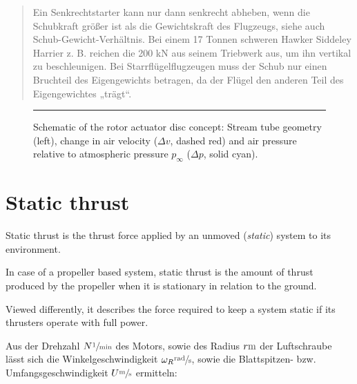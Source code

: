 \begin{quote}
Ein Senkrechtstarter kann nur dann senkrecht abheben, wenn die Schubkraft größer ist als die Gewichtskraft des Flugzeugs, siehe auch Schub-Gewicht-Verhältnis. Bei einem 17 Tonnen schweren Hawker Siddeley Harrier z. B. reichen die 200 kN aus seinem Triebwerk aus, um ihn vertikal zu beschleunigen. Bei Starrflügelflugzeugen muss der Schub nur einen Bruchteil des Eigengewichts betragen, da der Flügel den anderen Teil des Eigengewichtes „trägt“.
\end{quote}

\begin{figure}
	

	\rule{35em}{0.5pt}
	\caption[Schematic of the rotor actuator disc concept]
			{Schematic of the rotor actuator disc concept: Stream tube geometry (left),
			 change in air velocity ($\Delta v$, dashed red) and
			 air pressure relative to 
			 atmospheric pressure $p_\infty$ ($\Delta p$, solid cyan).}
	\label{fig:actuator_disc}
\end{figure}

\section{Static thrust}


Static thrust %
is the thrust force applied by an unmoved (\textit{static}) system to its environment.

In case of a propeller based system, static thrust is the amount of thrust 
produced by the propeller when it is stationary in relation to the ground.

Viewed differently, it describes the force required to keep a system static if its 
thrusters operate with full power. 



\bigbreak

Aus der Drehzahl 
$N \withunit{\per\minute}$ 
des Motors, sowie des Radius 
$r \withunit{\metre}$ 
der Luftschraube lässt sich die Winkelgeschwindigkeit 
$\omega_R \withunit{\radian\per\second}$, 
sowie die Blattspitzen- bzw. Umfangsgeschwindigkeit 
$U \withunit{\metre\per\second}$ 
ermitteln:

